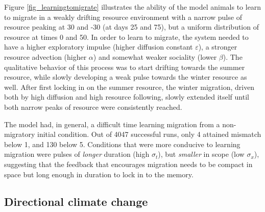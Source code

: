 \documentclass[utf8]{frontiersSCNS} %
\begin{document}
	Figure \ref{fig_learningtomigrate} illustrates the ability of the model animals to learn to migrate in a weakly drifting resource environment with a narrow pulse of resource peaking at 30 and -30 (at days 25 and 75), but a uniform distribution of resource at times 0 and 50. In order to learn to migrate, the system needed to have a higher exploratory impulse (higher diffusion constant $\varepsilon$), a stronger resource advection (higher $\alpha$) and somewhat weaker sociality (lower $\beta$). The qualitative behavior of this process was to start drifting towards the summer resource, while slowly developing a weak pulse towards the winter resource as well. After first locking in on the summer resource, the winter migration, driven both by high diffusion and high resource following, slowly extended itself until both narrow peaks of resource were consistently reached.
	
	The model had, in general, a difficult time learning migration from a non-migratory initial condition. Out of 4047 successful runs, only 4 attained mismatch below 1, and 130 below 5. Conditions that were more conducive to learning migration were pulses of \emph{longer} duration (high $\sigma_t$), but \emph{smaller} in scope (low $\sigma_x$), suggesting that the feedback that encourages migration needs to be compact in space but long enough in duration to lock in to the memory.
	
\subsection{Directional climate change}
	
\end{document}

